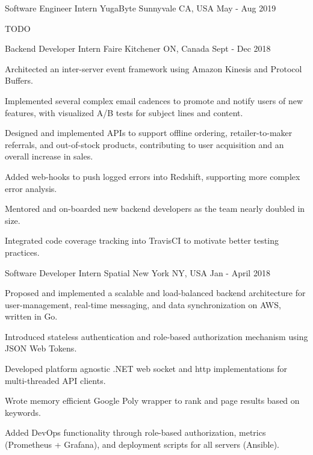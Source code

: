 
\begin{cventries}

\cventry
    {Software Engineer Intern}
    {YugaByte}
    {Sunnyvale CA, USA}
    {May - Aug 2019}
    {
      \begin{cvitems}
        \item TODO
      \end{cvitems}
    }

\cventry
    {Backend Developer Intern}
    {Faire}
    {Kitchener ON, Canada}
    {Sept - Dec 2018}
    {
      \begin{cvitems}
        \item Architected an inter-server event framework using Amazon Kinesis and Protocol Buffers.
        \item Implemented several complex email cadences to promote and notify users of new features,
        with visualized A/B tests for subject lines and content.
        \item Designed and implemented APIs to support offline ordering, retailer-to-maker referrals,
        and out-of-stock products, contributing to user acquisition and an overall increase in sales.
        \item Added web-hooks to push logged errors into Redshift, supporting more complex error analysis.
        \item Mentored and on-boarded new backend developers as the team nearly doubled in size.
        \item Integrated code coverage tracking into TravisCI to motivate better testing practices.
      \end{cvitems}
    }
    
\cventry
    {Software Developer Intern}
    {Spatial}
    {New York NY, USA}
    {Jan - April 2018}
    {
      \begin{cvitems}
        \item Proposed and implemented a scalable and load-balanced backend architecture for
        user-management,
        real-time messaging, and data synchronization on AWS, written in Go.
        \item Introduced stateless authentication and role-based authorization mechanism using JSON Web
        Tokens.
        \item Developed platform agnostic .NET web socket and http implementations for multi-threaded API
        clients.
        \item Wrote memory efficient Google Poly wrapper to rank and page results based on keywords.
        \item Added DevOps functionality through role-based authorization, metrics (Prometheus + Grafana),
        and deployment scripts for all servers (Ansible).
      \end{cvitems}
    }
    

\end{cventries}
